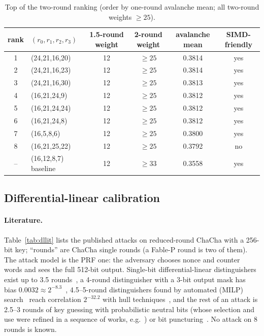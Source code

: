 \documentclass{iacrtrans}
\newcommand{\FableP}{\textsf{Fable-P}\xspace}
\newcommand{\ChaCha}{\textsf{ChaCha}\xspace}
\newcommand{\WuncTwo}{33}    %
\begin{document}
\begin{table}[htb]
\centering
\caption{Top of the two-round ranking (order by one-round avalanche mean; all two-round weights $\geq 25$).}
\label{tab:top8}
\footnotesize
\begin{tabular}{clcccc}
\toprule
rank & $(r_0,r_1,r_2,r_3)$ & 1.5-round weight & 2-round weight & avalanche mean & SIMD-friendly\\
\midrule
1 & (24,21,16,20) & 12 & $\geq 25$ & 0.3814 & yes\\
2 & (24,21,16,23) & 12 & $\geq 25$ & 0.3814 & yes\\
3 & (24,21,16,30) & 12 & $\geq 25$ & 0.3813 & yes\\
4 & (16,21,24,9) & 12 & $\geq 25$ & 0.3812 & yes\\
5 & (16,21,24,24) & 12 & $\geq 25$ & 0.3812 & yes\\
6 & (16,21,24,8) & 12 & $\geq 25$ & 0.3812 & yes\\
7 & (16,5,8,6) & 12 & $\geq 25$ & 0.3800 & yes\\
8 & (16,21,25,22) & 12 & $\geq 25$ & 0.3792 & no\\
-- & (16,12,8,7) baseline & 12 & $\geq \WuncTwo$ & 0.3558 & yes\\
\bottomrule
\end{tabular}
\end{table}

\subsection{Differential-linear calibration}
\label{sec:dl}
\paragraph{Literature.} Table~\ref{tab:dllit} lists the published attacks on reduced-round \ChaCha with a 256-bit key; ``rounds'' are \ChaCha single rounds (a \FableP round is two of them). The attack model is the PRF one: the adversary chooses nonce and counter words and sees the full 512-bit output. Single-bit differential-linear distinguishers exist up to 3.5 rounds~\cite{BLT20}, a 4-round distinguisher with a 3-bit output mask has bias $0.0032 \approx 2^{-8.3}$~\cite{BLT20}, 4.5--5-round distinguishers found by automated (MILP) search~\cite{BGGMPS23} reach correlation $2^{-32.2}$ with hull techniques~\cite{XXTQ24}, and the rest of an attack is 2.5--3 rounds of key guessing with probabilistic neutral bits (whose selection and use were refined in a sequence of works, e.g.~\cite{DGSS22,DGSS23,DGM23,Dey24}) or bit puncturing~\cite{FT25}. No attack on 8 rounds is known.
\end{document}
